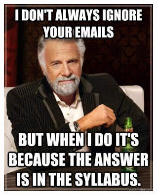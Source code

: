 \documentclass[slidestop,compress,mathserif,12pt,t,professionalfonts,xcolor=table]{beamer}
\begin{document}

\begin{frame}

\begin{center}
\includegraphics[width=0.6\textwidth]{figures/dont_always_syllabus.jpg}
\end{center}

\end{frame}

\end{document}
